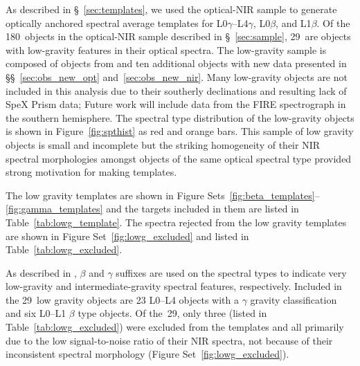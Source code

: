 \documentclass[12pt,preprint]{aastex}
\newcommand{\sample}{180}
\newcommand{\optLowG}{29}
\begin{document}
As described in \S~\ref{sec:templates}, we used the optical-NIR sample to generate optically anchored spectral average templates for L0$\gamma$--L4$\gamma$, L0$\beta$, and L1$\beta$.
Of the \sample~objects in the optical-NIR sample described in \S~\ref{sec:sample}, \optLowG~are objects with low-gravity features in their optical spectra.
The low-gravity sample is composed of objects from \citet{Cruz07,Kirkpatrick08,Cruz09_lowg} and ten additional objects with new data presented in \S\S~\ref{sec:obs_new_opt} and~\ref{sec:obs_new_nir}.
Many low-gravity objects are not included in this analysis due to their southerly declinations and resulting lack of SpeX Prism data; Future work will include data from the FIRE spectrograph in the southern hemisphere.
The spectral type distribution of the low-gravity objects is shown in Figure~\ref{fig:spthist} as red and orange bars.
This sample of low gravity objects is small and incomplete but the striking homogeneity of their NIR spectral morphologies amongst objects of the same optical spectral type provided strong motivation for making templates.

The low gravity templates are shown in Figure Sets~\ref{fig:beta_templates}--\ref{fig:gamma_templates} and the targets included in them are listed in Table~\ref{tab:lowg_template}.
The spectra rejected from the low gravity templates are shown in Figure Set~\ref{fig:lowg_excluded} and listed in Table~\ref{tab:lowg_excluded}.

As described in \cite{Cruz09_lowg}, $\beta$ and $\gamma$ suffixes are used on the spectral types to indicate very low-gravity and intermediate-gravity spectral features, respectively.
Included in the \optLowG~low gravity objects are 23 L0--L4 objects with a $\gamma$ gravity classification and six L0--L1 $\beta$ type objects.
Of the~\optLowG, only three (listed in Table~\ref{tab:lowg_excluded}) were excluded from the templates and all primarily due to the low signal-to-noise ratio of their NIR spectra, not because of their inconsistent spectral morphology (Figure Set~\ref{fig:lowg_excluded}).
\end{document}

